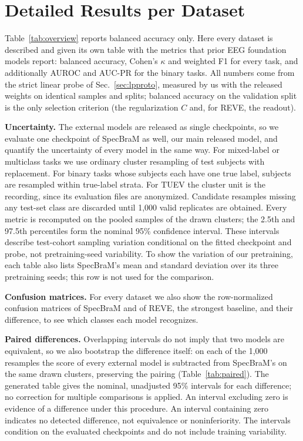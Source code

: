 \section{Detailed Results per Dataset}\label{app:fullmetrics}
Table~\ref{tab:overview} reports balanced accuracy only. Here every dataset is described and
given its own table with the metrics that prior EEG foundation models report: balanced accuracy,
Cohen's $\kappa$ and weighted F1 for every task, and additionally AUROC and AUC-PR for the binary
tasks. All numbers come from the strict linear probe of Sec.~\ref{sec:lpproto}, measured by us
with the released weights on identical samples and splits; balanced accuracy on the validation
split is the only selection criterion (the regularization $C$ and, for REVE, the readout).

\noindent\textbf{Uncertainty.} The external models are released as single checkpoints, so we
evaluate one checkpoint of SpecBraM as well, our main released model, and quantify the
uncertainty of every model in the same way. For mixed-label or multiclass tasks we use ordinary
cluster resampling of test subjects with replacement. For binary tasks whose subjects each
have one true label, subjects are resampled within true-label strata. For TUEV the cluster unit
is the recording, since its evaluation files are anonymized. Candidate resamples missing any
test-set class are discarded until 1{,}000 valid replicates are obtained. Every metric is
recomputed on the pooled samples of the drawn clusters; the 2.5th and 97.5th percentiles form
the nominal 95\% confidence interval. These intervals describe test-cohort sampling variation
conditional on the fitted checkpoint and probe, not pretraining-seed variability. To show the variation of our
pretraining, each table also lists SpecBraM's mean and standard deviation over its three
pretraining seeds; this row is not used for the comparison.

\noindent\textbf{Confusion matrices.} For every dataset we also show the row-normalized confusion
matrices of SpecBraM and of REVE, the strongest baseline, and their difference, to see which
classes each model recognizes.

\noindent\textbf{Paired differences.} Overlapping intervals do not imply that two models are
equivalent, so we also bootstrap the difference itself: on each of the 1{,}000 resamples the
score of every external model is subtracted from SpecBraM's on the same drawn clusters,
preserving the pairing (Table~\ref{tab:paired}). The generated table gives the nominal,
unadjusted 95\% intervals for each difference; no correction for multiple comparisons is
applied. An interval excluding zero is evidence of a difference under this procedure. An
interval containing zero indicates no detected difference, not equivalence or noninferiority.
The intervals condition on the evaluated checkpoints and do not include training variability.


